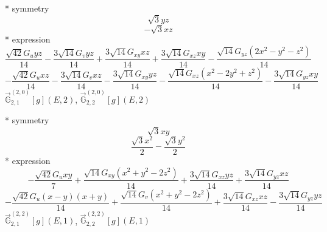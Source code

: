 \documentclass[fleqn,8pt]{jsarticle}
\begin{document}
\noindent\quad ** symmetry
\begin{dmath*}
\sqrt{3} y z
\end{dmath*}
\begin{dmath*}
- \sqrt{3} x z
\end{dmath*}
\noindent\quad ** expression
\begin{dmath*}
\frac{\sqrt{42} G_{u} y z}{14} - \frac{3 \sqrt{14} G_{v} y z}{14} + \frac{3 \sqrt{14} G_{xy} x z}{14} + \frac{3 \sqrt{14} G_{xz} x y}{14} - \frac{\sqrt{14} G_{yz} \left(2 x^{2} - y^{2} - z^{2}\right)}{14}
\end{dmath*}
\begin{dmath*}
- \frac{\sqrt{42} G_{u} x z}{14} - \frac{3 \sqrt{14} G_{v} x z}{14} - \frac{3 \sqrt{14} G_{xy} y z}{14} - \frac{\sqrt{14} G_{xz} \left(x^{2} - 2 y^{2} + z^{2}\right)}{14} - \frac{3 \sqrt{14} G_{yz} x y}{14}
\end{dmath*}
\noindent\quad $\vec{\mathbb{G}}_{2,1}^{(2,0)}[g](E,2)$, $\vec{\mathbb{G}}_{2,2}^{(2,0)}[g](E,2)$

\noindent\quad ** symmetry
\begin{dmath*}
\sqrt{3} x y
\end{dmath*}
\begin{dmath*}
\frac{\sqrt{3} x^{2}}{2} - \frac{\sqrt{3} y^{2}}{2}
\end{dmath*}
\noindent\quad ** expression
\begin{dmath*}
- \frac{\sqrt{42} G_{u} x y}{7} + \frac{\sqrt{14} G_{xy} \left(x^{2} + y^{2} - 2 z^{2}\right)}{14} + \frac{3 \sqrt{14} G_{xz} y z}{14} + \frac{3 \sqrt{14} G_{yz} x z}{14}
\end{dmath*}
\begin{dmath*}
- \frac{\sqrt{42} G_{u} \left(x - y\right) \left(x + y\right)}{14} + \frac{\sqrt{14} G_{v} \left(x^{2} + y^{2} - 2 z^{2}\right)}{14} + \frac{3 \sqrt{14} G_{xz} x z}{14} - \frac{3 \sqrt{14} G_{yz} y z}{14}
\end{dmath*}
\noindent\quad $\vec{\mathbb{G}}_{2,1}^{(2,2)}[g](E,1)$, $\vec{\mathbb{G}}_{2,2}^{(2,2)}[g](E,1)$
\end{document}
